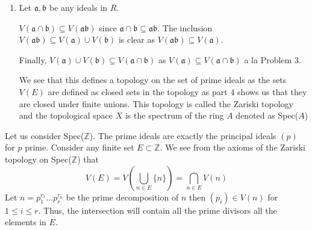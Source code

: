 \documentclass[12pt]{article}
\begin{document}
\begin{enumerate}
\item Let $\mathfrak{a},\mathfrak{b}$ be any ideals in $R$.

$V(\mathfrak{a} \cap \mathfrak{b}) \subseteq V(\mathfrak{a}\mathfrak{b})$ since $\mathfrak{a} \cap \mathfrak{b} \subseteq \mathfrak{ab}$. The inclusion $V(\mathfrak{a}  \mathfrak{b}) \subseteq V(\mathfrak{a}) \cup V(\mathfrak{b})$ is clear as $V(\mathfrak{a}  \mathfrak{b}) \subseteq V(\mathfrak{a}) $.

Finally, $V(\mathfrak{a}) \cup V(\mathfrak{b}) \subseteq V(\mathfrak{a} \cap \mathfrak{b})$ as $V(\mathfrak{a}) \subseteq V(\mathfrak{a} \cap  \mathfrak{b})$ a la Problem 3.

We see that this defines a topology on the set of prime ideals as the sets $V(E)$ are defined as closed sets in the topology as part 4 shows us that they are closed under finite unions. This topology is called the Zariski topology and the topological space $X$ is the spectrum of the ring $A$ denoted as Spec($A$)
\end{enumerate}

Let us consider Spec($\mathbb{Z}$). The prime ideals are exactly the principal ideals $(p)$ for $p$ prime. Consider any finite set $E \subset \mathbb{Z}$. We see from the axioms of the Zariski topology on Spec($\mathbb{Z}$) that 
$$ V(E) = V(\bigcup_{n \in E} \{ n\}) = \bigcap_{n \in E} V(n) $$
Let $n = p_1^{r_1}...p_r^{r_n}$ be the prime decomposition of $n$
then $(p_i) \in V(n)$ for $1 \leq i \leq r$. Thus, the intersection will contain all the prime divisors  all the elements in $E$. 
\end{document}
